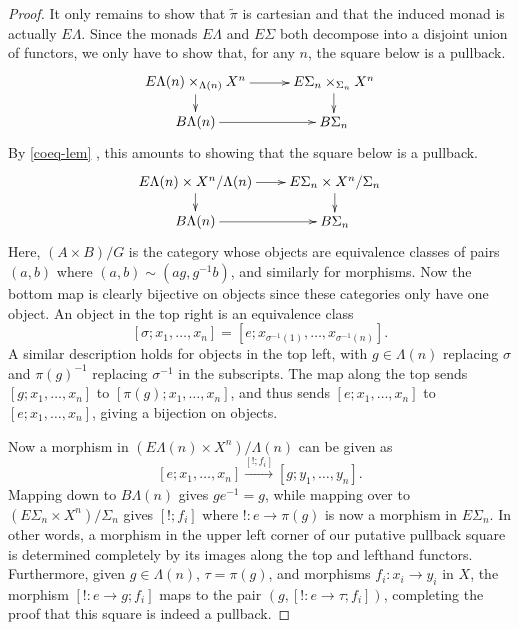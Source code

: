\begin{proof}
It only remains to show that $\tilde{\pi}$ is cartesian and that the induced monad is actually $E\Lambda$. Since the monads $E\Lambda$ and $E\Sigma$ both decompose into a disjoint union of functors, we only have to show that, for any $n$, the square below is a pullback.
  \[
    \xy
      (0,0)*+{E\Lambda(n) \times_{\Lambda(n)} X^n} ="00";
      (0,-10)*+{B\Lambda(n)} ="01";
      (35,0)*+{E\Sigma_{n} \times_{\Sigma_{n}} X^n} ="10";
      (35,-10)*+{B\Sigma_{n}} ="11";
      {\ar^{} "00" ; "10"};
      {\ar^{} "10" ; "11"};
      {\ar^{} "00" ; "01"};
      {\ar^{} "01" ; "11"};
    \endxy
  \]
By \cref{coeq-lem}
, this amounts to showing that the square below is a pullback.
  \[
    \xy
      (0,0)*+{E\Lambda(n) \times X^n/\Lambda(n)} ="00";
      (0,-10)*+{B\Lambda(n)} ="01";
      (35,0)*+{E\Sigma_{n} \times X^n/\Sigma_{n}} ="10";
      (35,-10)*+{B\Sigma_{n}} ="11";
      {\ar^{} "00" ; "10"};
      {\ar^{} "10" ; "11"};
      {\ar^{} "00" ; "01"};
      {\ar^{} "01" ; "11"};
    \endxy
  \]
Here, $(A \times B)/G$ is the category whose objects are equivalence classes of pairs $(a,b)$ where $(a,b) \sim (ag, g^{-1}b)$, and similarly for morphisms. Now the bottom map is clearly bijective on objects since these categories only have one object. An object in the top right is an equivalence class
  \[
    [\sigma; x_{1}, \ldots, x_{n}] = \left[e; x_{\sigma^{-1}(1)}, \ldots, x_{\sigma^{-1}(n)}\right].
  \]
A similar description holds for objects in the top left, with $g \in \Lambda(n)$ replacing $\sigma$ and $\pi(g)^{-1}$ replacing $\sigma^{-1}$ in the subscripts. The map along the top sends $[g; x_{1}, \ldots, x_{n}]$ to $[\pi(g); x_{1}, \ldots, x_{n}]$, and thus sends $[e; x_{1}, \ldots, x_{n}]$ to $[e; x_{1}, \ldots, x_{n}]$, giving a bijection on objects.

Now a morphism in $(E\Lambda(n) \times X^{n})/\Lambda(n)$ can be given as
  \[
    [e; x_{1}, \ldots, x_{n}] \stackrel{[!; f_{i}]}{\longrightarrow} [g; y_{1}, \ldots, y_{n}].
  \]
Mapping down to $B\Lambda(n)$ gives $ge^{-1} = g$, while mapping over to $(E\Sigma_{n} \times X^{n})/\Sigma_{n}$ gives $[!; f_{i}]$ where $! \colon e \rightarrow \pi(g)$ is now a morphism in $E\Sigma_{n}$. In other words, a morphism in the upper left corner of our putative pullback square is determined completely by its images along the top and lefthand functors. Furthermore, given $g \in \Lambda(n)$, $\tau = \pi(g)$, and morphisms $f_{i} \colon x_{i} \rightarrow y_{i}$ in $X$, the morphism $[! \colon e \rightarrow g; f_{i}]$ maps to the pair $(g, [! \colon e \rightarrow \tau; f_{i}])$, completing the proof that this square is indeed a pullback.
\end{proof}

